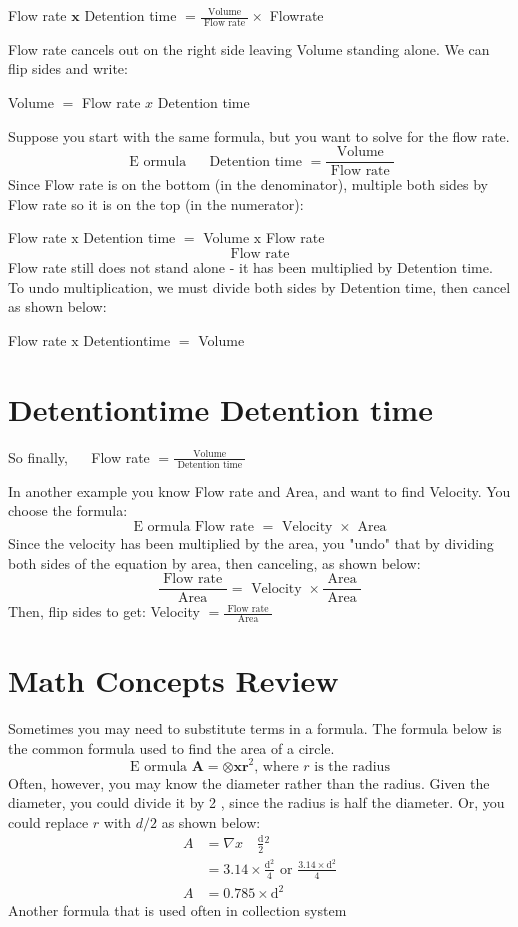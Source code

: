 \documentclass[10pt]{article}
\begin{document}
Flow rate $\mathbf{x}$ Detention time $=\frac{\text { Volume }}{\text { Flow rate }} \times$ Flowrate

Flow rate cancels out on the right side leaving Volume standing alone. We can flip sides and write:

Volume $=$ Flow rate $x$ Detention time

Suppose you start with the same formula, but you want to solve for the flow rate.
$$
\text { E ormula } \quad \text { Detention time }=\frac{\text { Volume }}{\text { Flow rate }}
$$
Since Flow rate is on the bottom (in the denominator), multiple both sides by Flow rate so it is on the top (in the numerator):

Flow rate $\mathrm{x}$ Detention time $=$ Volume $\mathrm{x}$ Flow rate
$$
\text { Flow rate }
$$
Flow rate still does not stand alone - it has been multiplied by Detention time. To undo multiplication, we must divide both sides by Detention time, then cancel as shown below:

Flow rate $\mathrm{x}$ Detentiontime $=$ Volume

\section{Detentiontime Detention time}
So finally, $\quad$ Flow rate $=\frac{\text { Volume }}{\text { Detention time }}$

In another example you know Flow rate and Area, and want to find Velocity. You choose the formula:
$$
\text { E ormula Flow rate }=\text { Velocity } \times \text { Area }
$$
Since the velocity has been multiplied by the area, you "undo" that by dividing both sides of the equation by area, then canceling, as shown below:
$$
\frac{\text { Flow rate }}{\text { Area }}=\text { Velocity } \times \frac{\text { Area }}{\text { Area }}
$$
Then, flip sides to get: Velocity $=\frac{\text { Flow rate }}{\text { Area }}$

\section{Math Concepts Review}
Sometimes you may need to substitute terms in a formula. The formula below is the common formula used to find the area of a circle.
$$
\text { E ormula } \mathbf{A}=\otimes \mathbf{x} \mathbf{r}^{2} \text {, where } r \text { is the radius }
$$
Often, however, you may know the diameter rather than the radius. Given the diameter, you could divide it by 2 , since the radius is half the diameter. Or, you could replace $r$ with $d / 2$ as shown below:
$$
\begin{aligned}
A &=\nabla x \quad \frac{\mathrm{d}}{2}{ }^{2} \\
&=3.14 \times \frac{\mathrm{d}^{2}}{4} \text { or } \frac{3.14 \times \mathrm{d}^{2}}{4} \\
A &=0.785 \times \mathrm{d}^{2}
\end{aligned}
$$
Another formula that is used often in collection system
\end{document}
